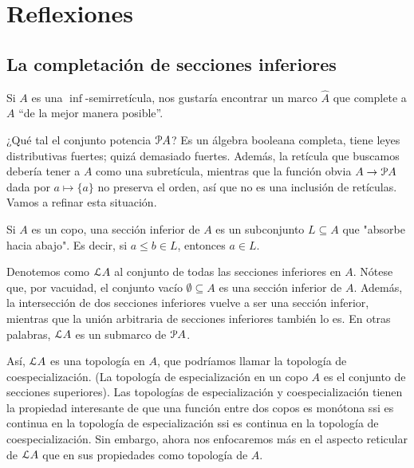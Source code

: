 \section{Reflexiones}

\subsection{La completación de secciones inferiores}
Si $A$ es una $\inf$-semirretícula, nos gustaría encontrar un
marco $\hat A$ que complete a $A$ ``de la mejor manera posible''.

¿Qué tal el conjunto potencia $\cal PA$?
Es un álgebra booleana completa, tiene leyes distributivas
fuertes; quizá demasiado fuertes.
Además, la retícula que buscamos debería tener a $A$ como una
subretícula, mientras que
la función obvia $A\to\cal PA$ dada por $a\mapsto\{a\}$
no preserva el orden, así que no es una inclusión de
retículas.
Vamos a refinar esta situación.

Si $A$ es un copo, una sección inferior de $A$
es un subconjunto $L\subseteq A$ que "absorbe hacia abajo".
Es decir, si $a\leq b\in L$, entonces $a\in L$.

Denotemos como $\cal LA$ al conjunto de todas las secciones
inferiores en $A$.
Nótese que, por vacuidad, el conjunto vacío
$\emptyset\subseteq A$ es una sección inferior de $A$.
Además, la intersección de dos secciones
inferiores vuelve a ser una sección inferior, mientras que la
unión arbitraria de secciones inferiores también lo es.
En otras palabras, $\cal LA$ es un submarco de $\cal PA$.

Así, $\cal LA$ es una topología en $A$, que podríamos llamar la
topología de coespecialización. (La topología de especialización
en un copo $A$ es el conjunto de secciones superiores).
Las topologías de especialización y coespecialización tienen la
propiedad interesante de que una función entre dos copos es
monótona ssi es continua en la topología de
especialización ssi es continua en la topología de
coespecialización.
Sin embargo, ahora nos enfocaremos más en el aspecto reticular
de $\cal LA$ que en sus propiedades como topología de $A$.

